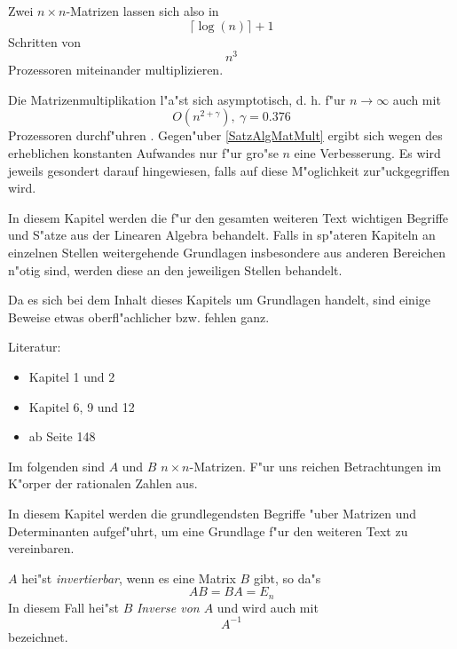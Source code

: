 Zwei $n \times n$-Matrizen lassen sich also in 
\[ \lceil \log(n) \rceil + 1 \] Schritten von
\[ n^3 \] Prozessoren miteinander multiplizieren.

Die \label{PageAlg2MatMult}
Matrizenmultiplikation l"a"st sich asymptotisch, d. h. f"ur $n \to \infty$
auch mit
\[ O(n^{2+\gamma}), \: \gamma = 0.376 \]
Prozessoren durchf"uhren \cite{CW90}. Gegen"uber \ref{SatzAlgMatMult} 
ergibt sich wegen des erheblichen konstanten Aufwandes nur f"ur gro"se $n$ 
eine Verbesserung. Es wird jeweils gesondert darauf hingewiesen, falls
auf diese M"oglichkeit zur"uckgegriffen wird.


\label{ChapBase}

In diesem Kapitel werden die f"ur den gesamten weiteren Text wichtigen 
Begriffe und S"atze aus der Linearen Algebra behandelt. Falls in sp"ateren
Kapiteln an einzelnen Stellen weitergehende Grundlagen insbesondere aus 
anderen Bereichen n"otig sind, werden diese an den jeweiligen Stellen 
behandelt.

Da es sich bei dem Inhalt dieses Kapitels um
Grundlagen handelt, sind einige Beweise etwas oberfl"achlicher bzw. 
fehlen ganz.

Literatur:
\begin{itemize}
\item
      \cite{MM64} Kapitel 1 und 2
\item
      \cite{Doer77} Kapitel 6, 9 und 12
\item
      \cite{BS87} ab Seite 148
\end{itemize}

Im folgenden sind $A$ und $B$ $n \times n$-Matrizen. F"ur uns reichen
Betrachtungen im K"orper der rationalen Zahlen aus.


\label{SecMatUndDet}

In diesem Kapitel werden die grundlegendsten Begriffe "uber Matrizen
und Determinanten aufgef"uhrt, um eine Grundlage f"ur den weiteren 
Text zu vereinbaren. 

\MyBeginDef
{}
\label{DefInvertierbar}
    $A$ hei"st {\em invertierbar}, wenn es eine
    Matrix $B$ gibt, so da"s \[ AB = BA = E_n \]
    In diesem Fall hei"st $B$ {\em Inverse von $A$} und wird auch mit
    \[ A^{-1} \] bezeichnet.
\MyEndDef

